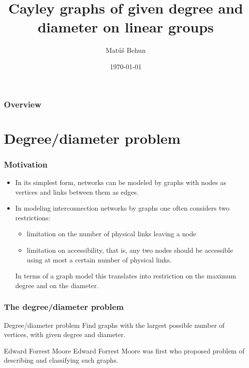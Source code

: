 \documentclass{beamer}
\title[]{Cayley graphs of given degree and diameter on linear groups} %
\author{Mat\'u\v{s} Behun} %
\institute[UCLA] %
{
Slovak University of Technology in Bratislava \\ %
\medskip
}
\date{\today} %
\begin{document}
\begin{frame}
\titlepage 
\end{frame}
\begin{frame}
\frametitle{Overview}
\tableofcontents
\end{frame}
\section{Degree/diameter problem} 
\begin{frame}
	\frametitle{Motivation}
\begin{itemize}
    \item In its simplest form, networks can be modeled by graphs with nodes as vertices and links between them as edges.
	\item In modeling interconnection networks by graphs one often considers two restrictions: 
		\begin{itemize}
			\item limitation on the number of physical links leaving a node
			\item limitation on accessibility, that is, any two nodes should be accessible using at most a certain number of physical links. 
		\end{itemize}
		In terms of a graph model this translates into restriction on the maximum degree and on the diameter.
\end{itemize}
\end{frame}
\begin{frame}
\frametitle{The degree/diameter problem}
	\begin{block}{Degree/diameter problem}
		Find graphs with the largest possible number of vertices, with given degree and diameter.
	\end{block}
	\begin{block}{Edward Forrest Moore}
		Edward Forrest Moore was first who proposed problem of describing and classifying such graphs.
	\end{block}
\end{frame}
\end{document}
